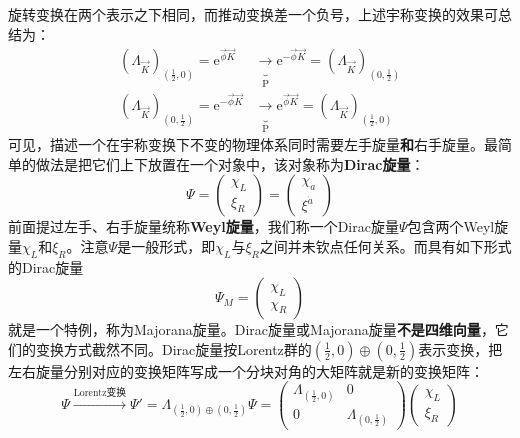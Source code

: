 旋转变换在两个表示之下相同，而推动变换差一个负号，上述宇称变换的效果可总结为：
\begin{align}
\label{equ3.224}
    (\Lambda_{\vec{K}})_{(\frac{1}{2}, 0)} = \mathrm{e}^{\vec{\phi} \vec{K}} &\underbrace{\rightarrow}_{\mathrm{P}} \mathrm{e}^{- \vec{\phi} \vec{K}} = (\Lambda_{\vec{K}})_{(0, \frac{1}{2})} \\
\label{equ3.225}
    (\Lambda_{\vec{K}})_{(0, \frac{1}{2})} = \mathrm{e}^{- \vec{\phi} \vec{K}} &\underbrace{\rightarrow}_{\mathrm{P}} \mathrm{e}^{\vec{\phi} \vec{K}} = (\Lambda_{\vec{K}})_{(\frac{1}{2}, 0)}
\end{align}
可见，描述一个在宇称变换下不变的物理体系同时需要左手旋量{\bfseries 和}右手旋量。最简单的做法是把它们上下放置在一个对象中，该对象称为{\bfseries Dirac旋量}：
\begin{equation}
\label{equ3.226}
    \Psi =
        \begin{pmatrix}
            \chi_L \\ \xi_R
        \end{pmatrix}
    =
        \begin{pmatrix}
            \chi_a \\ \xi^{\dot{a}}
        \end{pmatrix}
\end{equation}
前面提过左手、右手旋量统称{\bfseries Weyl旋量}，我们称一个Dirac旋量$\Psi$包含两个Weyl旋量$\chi_L$和$\xi_R$。注意$\Psi$是一般形式，即$\chi_L$与$\xi_R$之间并未钦点任何关系。而具有如下形式的Dirac旋量
\begin{equation}
\label{equ3.227}
    \Psi_{M} =
        \begin{pmatrix}
            \chi_L \\ \chi_R
        \end{pmatrix}
\end{equation}
就是一个特例，称为Majorana旋量。Dirac旋量或Majorana旋量{\bfseries 不是四维向量}，它们的变换方式截然不同。Dirac旋量按Lorentz群的$(\frac{1}{2}, 0) \oplus (0, \frac{1}{2})$表示变换，把左右旋量分别对应的变换矩阵写成一个分块对角的大矩阵就是新的变换矩阵：
\begin{equation}
\label{equ3.228}
    \Psi \stackrel{\text{Lorentz变换}}{\longrightarrow} \Psi' = \Lambda_{(\frac{1}{2}, 0) \oplus (0, \frac{1}{2})} \Psi =
        \begin{pmatrix}
            \Lambda_{(\frac{1}{2}, 0)} & 0 \\
            0 & \Lambda_{(0, \frac{1}{2})}
        \end{pmatrix}
        \begin{pmatrix}
            \chi_L \\ \xi_R
        \end{pmatrix}
\end{equation}
